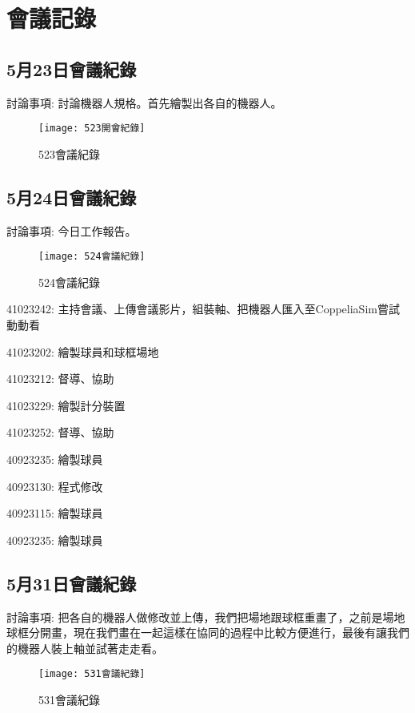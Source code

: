 \chapter{會議記錄}
\section{5月23日會議紀錄}
討論事項: 討論機器人規格。首先繪製出各自的機器人。\\

\begin{figure}[hbt!]
\begin{center}
\label{523會議紀錄}
\texttt{[image: 523開會紀錄]}
\caption{\Large 523會議紀錄}
\end{center}
\end{figure}

\section{5月24日會議紀錄}
討論事項: 今日工作報告。\\

\begin{figure}[hbt!]
\begin{center}
\label{524會議紀錄}
\texttt{[image: 524會議紀錄]}
\caption{\Large 524會議紀錄}
\end{center}
\end{figure}

41023242: 主持會議、上傳會議影片，組裝軸、把機器人匯入至CoppeliaSim嘗試動動看\

41023202: 繪製球員和球框場地\

41023212: 督導、協助\

41023229: 繪製計分裝置\

41023252: 督導、協助\

40923235: 繪製球員\

40923130: 程式修改\

40923115: 繪製球員\

40923235: 繪製球員\\

\section{5月31日會議紀錄}
討論事項: 把各自的機器人做修改並上傳，我們把場地跟球框重畫了，之前是場地球框分開畫，現在我們畫在一起這樣在協同的過程中比較方便進行，最後有讓我們的機器人裝上軸並試著走走看。\\

\begin{figure}[hbt!]
\begin{center}
\label{531會議紀錄}
\texttt{[image: 531會議紀錄]}
\caption{\Large 531會議紀錄}
\end{center}
\end{figure}

\newpage
